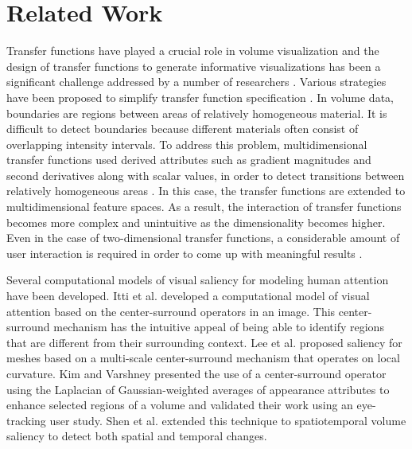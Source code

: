 \section{Related Work}
Transfer functions have played a crucial role in volume visualization and the design of transfer functions to generate informative visualizations has been a significant challenge addressed by a number of researchers \cite{pfister_transfer_2001}.
Various strategies have been proposed to simplify transfer function specification \cite{hadwiger_real-time_2006}.
In volume data, boundaries are regions between areas of relatively homogeneous material. It is difficult to detect boundaries because different materials often consist of overlapping intensity intervals. To address this problem, multidimensional transfer functions used derived attributes such as gradient magnitudes and second derivatives along with scalar values, in order to detect transitions between relatively homogeneous areas \cite{kindlmann_semi-automatic_1998} \cite{kniss_multidimensional_2002} \cite{kindlmann_transfer_2002}.
In this case, the transfer functions are extended to multidimensional feature spaces. As a result, the interaction of transfer functions becomes more complex and unintuitive as the dimensionality becomes higher.
Even in the case of two-dimensional transfer functions, a considerable amount of user interaction is
required in order to come up with meaningful results \cite{arens_survey_2010}.

Several computational models of visual saliency for modeling human attention have been developed.
Itti et al. \cite{itti_model_1998} developed a computational model of visual attention based on the center-surround operators in an image. This center-surround mechanism has the intuitive appeal of being able to identify regions that are different from their surrounding context.
Lee et al. \cite{lee_mesh_2005} proposed saliency for meshes based on a multi-scale center-surround mechanism that operates on local curvature. Kim and Varshney \cite{kim_saliency-guided_2006} presented the use of a center-surround operator using the Laplacian of Gaussian-weighted averages of appearance attributes to enhance selected regions of a volume and validated their work using an eye-tracking user study. Shen et al. \cite{shen_spatiotemporal_2015} extended this technique to spatiotemporal volume saliency to detect both spatial and temporal changes.

